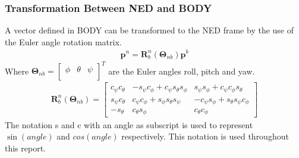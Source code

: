 \subsubsection{Transformation Between NED and BODY}
A vector defined in BODY can be transformed to the NED frame by the use of the Euler angle rotation matrix.
\begin{eqnarray}
\boldsymbol{p}^n = \boldsymbol{R}_b^n(\boldsymbol{\Theta}_{nb})\boldsymbol{p}^b
\end{eqnarray}
Where $\boldsymbol{\Theta}_{nb} = \begin{bmatrix}
\phi & \theta & \psi\\
\end{bmatrix}^T$ are the Euler angles roll, pitch and yaw. 
\begin{eqnarray}
\boldsymbol{R} _b^n(\boldsymbol{\Theta}_{nb}) = 
\begin{bmatrix}
c_\psi c_\theta & -s_\psi c_\phi + c_\psi s_\theta s_\phi & s_\psi s_\phi + c_\psi c_\phi s_\theta\\
s_\psi c_\theta & c_\psi c_\phi + s_\phi s_\theta s_\psi & -c_\psi s_\phi + s_\theta s_\psi c_\phi\\
-s_\theta & c_\theta s_\phi & c_\theta c_\phi
\end{bmatrix}
\label{R_ned}
\end{eqnarray}
The notation s and c with an angle as subscript is used to represent $\sin (angle)$ and $cos (angle)$ respectively. This notation is used throughout this report.
